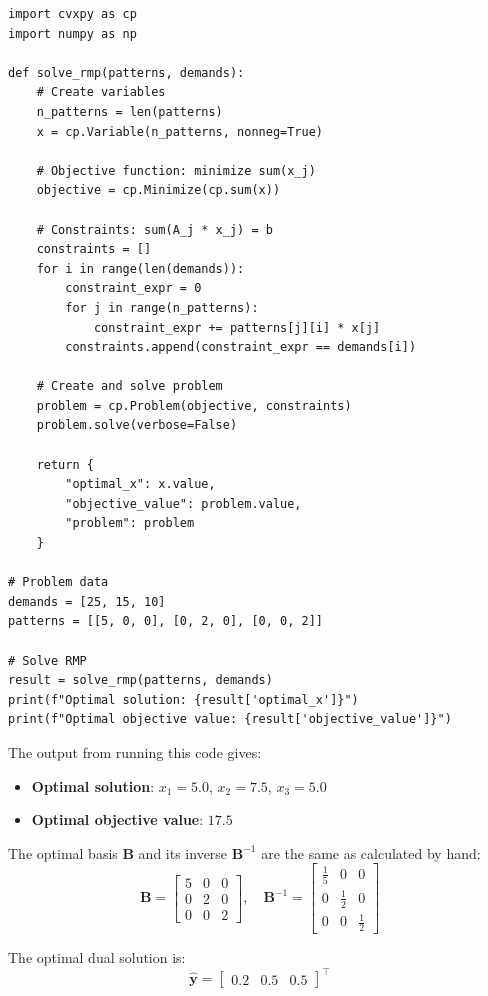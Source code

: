 \documentclass[11pt]{article}
\newcommand{\mb}[1]{\ensuremath{\boldsymbol{#1}}}
\begin{document}
\begin{enumerate}
\begin{enumerate}
\begin{verbatim}
import cvxpy as cp
import numpy as np

def solve_rmp(patterns, demands):
    # Create variables
    n_patterns = len(patterns)
    x = cp.Variable(n_patterns, nonneg=True)
    
    # Objective function: minimize sum(x_j)
    objective = cp.Minimize(cp.sum(x))
    
    # Constraints: sum(A_j * x_j) = b
    constraints = []
    for i in range(len(demands)):
        constraint_expr = 0
        for j in range(n_patterns):
            constraint_expr += patterns[j][i] * x[j]
        constraints.append(constraint_expr == demands[i])
    
    # Create and solve problem
    problem = cp.Problem(objective, constraints)
    problem.solve(verbose=False)
    
    return {
        "optimal_x": x.value,
        "objective_value": problem.value,
        "problem": problem
    }

# Problem data
demands = [25, 15, 10]
patterns = [[5, 0, 0], [0, 2, 0], [0, 0, 2]]

# Solve RMP
result = solve_rmp(patterns, demands)
print(f"Optimal solution: {result['optimal_x']}")
print(f"Optimal objective value: {result['objective_value']}")
\end{verbatim}

The output from running this code gives:
\begin{itemize}
\item \textbf{Optimal solution}: $x_1 = 5.0$, $x_2 = 7.5$, $x_3 = 5.0$
\item \textbf{Optimal objective value}: $17.5$
\end{itemize}

The optimal basis $\mb{B}$ and its inverse $\mb{B}^{-1}$ are the same as calculated by hand:
$$\mb{B} = \begin{bmatrix} 5 & 0 & 0 \\ 0 & 2 & 0 \\ 0 & 0 & 2 \end{bmatrix}, \quad \mb{B}^{-1} = \begin{bmatrix} \frac{1}{5} & 0 & 0 \\ 0 & \frac{1}{2} & 0 \\ 0 & 0 & \frac{1}{2} \end{bmatrix}$$

The optimal dual solution is:
$$\hat{\mb{y}} = \begin{bmatrix} 0.2 & 0.5 & 0.5 \end{bmatrix}^\top$$



\end{enumerate}
\end{enumerate}
\end{document}
